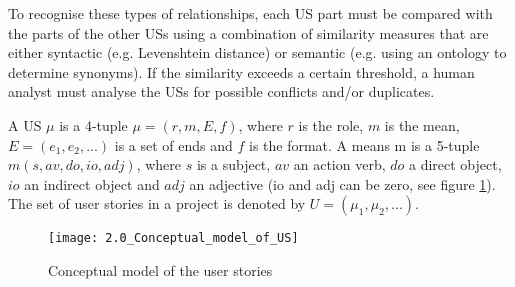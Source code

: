 To recognise these types of relationships, each US part must be compared with the parts of the other USs using a combination of similarity measures that are either syntactic (e.g. Levenshtein distance) or semantic (e.g. using an ontology to determine synonyms). If the similarity exceeds a certain threshold, a human analyst must analyse the USs for possible conflicts and/or duplicates.
\begin{definition}
A US $\mu$ is a 4-tuple $\mu=(r,m,E,f)$, where $r$ is the role, $m$ is the mean, $E=(e_1, e_2, . . .)$ is a set of ends and $f$ is the format. A means m is a 5-tuple $m (s,av,do,io,adj)$, where $s$ is a subject, $av$ an action verb, $do$ a direct object, $io$ an indirect object and $adj$ an adjective (io and adj can be zero, see figure \ref{fig:conceptual_model}). The set of user stories in a project is denoted by $U=(\mu_1, \mu_2, . . .)$.
\end{definition}
\begin{figure}[h]
\center
\texttt{[image: 2.0\_Conceptual\_model\_of\_US]}
\caption{Conceptual model of the user stories \cite{lucassen2016improving}}\label{fig:conceptual_model}
\end{figure}
